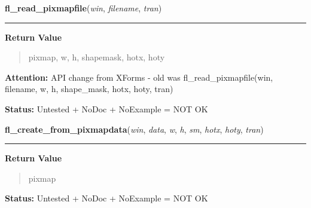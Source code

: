 \hspace{.8\funcindent}\begin{boxedminipage}{\funcwidth}

    \raggedright \textbf{fl\_read\_pixmapfile}(\textit{win}, \textit{filename}, \textit{tran})

    \vspace{-1.5ex}

    \rule{\textwidth}{0.5\fboxrule}
\setlength{\parskip}{2ex}
\setlength{\parskip}{1ex}
      \textbf{Return Value}
    \vspace{-1ex}

      \begin{quote}
      pixmap, w, h, shapemask, hotx, hoty

      \end{quote}

\textbf{Attention:} API change from XForms - old was fl\_read\_pixmapfile(win, filename, w, h, 
shape\_mask, hotx, hoty, tran)



\textbf{Status:} Untested + NoDoc + NoExample = NOT OK



    \end{boxedminipage}

    \label{xformslib:library:fl_create_from_pixmapdata}

    \vspace{0.5ex}

\hspace{.8\funcindent}\begin{boxedminipage}{\funcwidth}

    \raggedright \textbf{fl\_create\_from\_pixmapdata}(\textit{win}, \textit{data}, \textit{w}, \textit{h}, \textit{sm}, \textit{hotx}, \textit{hoty}, \textit{tran})

    \vspace{-1.5ex}

    \rule{\textwidth}{0.5\fboxrule}
\setlength{\parskip}{2ex}
\setlength{\parskip}{1ex}
      \textbf{Return Value}
    \vspace{-1ex}

      \begin{quote}
      pixmap

      \end{quote}

\textbf{Status:} Untested + NoDoc + NoExample = NOT OK



    \end{boxedminipage}

